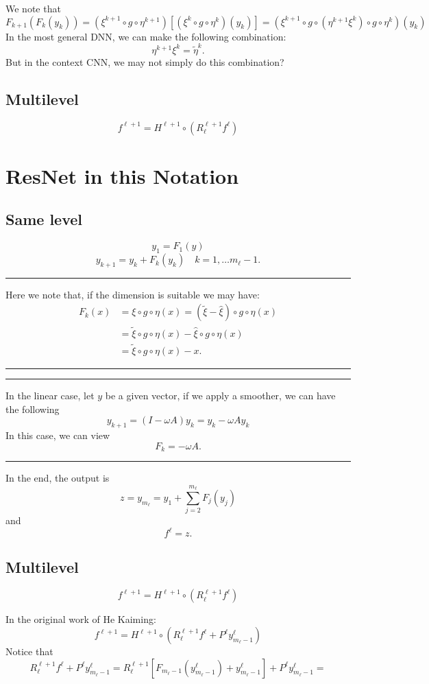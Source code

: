 We note that
$$
F_{k+1}(F_{k}(y_k))
=(\xi^{k+1} \circ g \circ \eta^{k+1})[(\xi^k \circ g \circ \eta^k)(y_k)]
=(\xi^{k+1} \circ g \circ (\eta^{k+1}\xi^k)\circ g \circ\eta^k)(y_k)
$$
In the most general DNN, we can make the following combination:
$$
\eta^{k+1}\xi^k=\tilde \eta^k.
$$
But in the context CNN, we may not simply do this combination?

\subsection{Multilevel}
$$
f^{\ell+1}=H^{\ell+1}\circ (R_{\ell}^{\ell+1}f^\ell)
$$

\section{ResNet in this Notation}
\subsection{Same level}
$$
y_1=F_1(y)
$$
$$
y_{k+1}=y_k+  F_k(y_{k})
\quad k=1,\ldots m_\ell-1.
$$

\bigskip
\hrule  
Here we note that, if the dimension is suitable we may have:
\begin{align}
F_k(x) &= \xi \circ g \circ  \eta (x) = ( \tilde \xi - \hat \xi) \circ g \circ \eta (x) \\
&= \tilde \xi \circ g \circ \eta (x) - \hat \xi \circ g \circ \eta(x) \\
&=  \tilde \xi \circ g \circ \eta (x)  - x .
\end{align}
\hrule 
\bigskip

\hrule 
\bigskip 
In the linear case, let $y$ be a given vector, if we apply a smoother,
we can have the following
$$
y_{k+1}=(I-\omega A) y_k
=y_k-\omega A y_k
$$
In this case, we can view
$$
F_k=-\omega A.
$$
\bigskip 
\hrule 
\bigskip

In the end,  the output is
$$
z=y_{m_\ell}=y_1+\sum_{j=2}^{m_\ell} F_j(y_j)
$$
and
$$
f^\ell=z.
$$
\subsection{Multilevel}
$$
f^{\ell+1}=H^{\ell+1}\circ (R_{\ell}^{\ell+1}f^\ell)
$$

In the original work of He Kaiming:
$$
f^{\ell+1}=H^{\ell+1}\circ (R_{\ell}^{\ell+1}f^\ell+P^\ell y_{m_\ell-1}^\ell)
$$
Notice that
$$
R_{\ell}^{\ell+1}f^\ell+P^\ell y_{m_\ell-1}^\ell=
R_{\ell}^{\ell+1}[F_{m_\ell-1}(y_{m_\ell-1}^\ell)+ y_{m_\ell-1}^\ell]+P^\ell y_{m_\ell-1}^\ell=
$$


